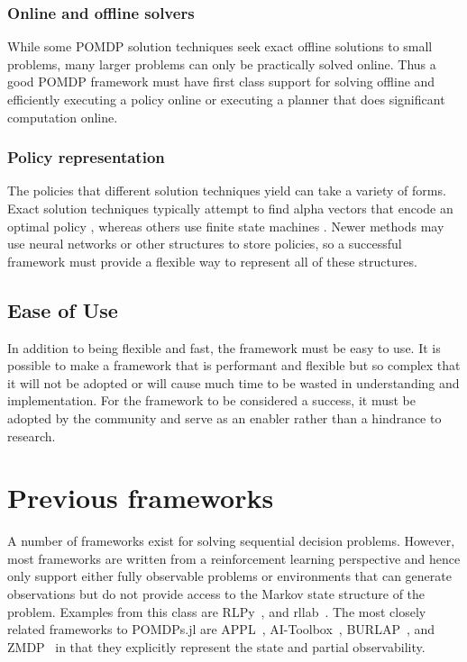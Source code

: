 \subsubsection{Online and offline solvers}

While some POMDP solution techniques seek exact offline solutions to small problems, many larger problems can only be practically solved online.
Thus a good POMDP framework must have first class support for solving offline and efficiently executing a policy online or executing a planner that does significant computation online.

\subsubsection{Policy representation}

The policies that different solution techniques yield can take a variety of forms.
Exact solution techniques typically attempt to find alpha vectors that encode an optimal policy \cite{kaelbling1998planning,kurniawati2008sarsop}, whereas others use finite state machines \cite{bai2014integrated}.
Newer methods may use neural networks \cite{karkus2017qmdp} or other structures to store policies, so a successful framework must provide a flexible way to represent all of these structures.

\subsection{Ease of Use}

In addition to being flexible and fast, the framework must be easy to use.
It is possible to make a framework that is performant and flexible but so complex that it will not be adopted or will cause much time to be wasted in understanding and implementation.
For the framework to be considered a success, it must be adopted by the community and serve as an enabler rather than a hindrance to research.

\section{Previous frameworks}

A number of frameworks exist for solving sequential decision problems.
However, most frameworks are written from a reinforcement learning perspective and hence only support either fully observable problems or environments that can generate observations but do not provide access to the Markov state structure of the problem.
Examples from this class are RLPy~\cite{geramifard2015rlpy}, and rllab~\cite{duan2016benchmarking}.
The most closely related frameworks to POMDPs.jl are APPL~\citep{appl}, AI-Toolbox~\citep{aitoolbox}, BURLAP~\cite{diuk2008object}, and ZMDP~\citep{zmdp} in that they explicitly represent the state and partial observability.

